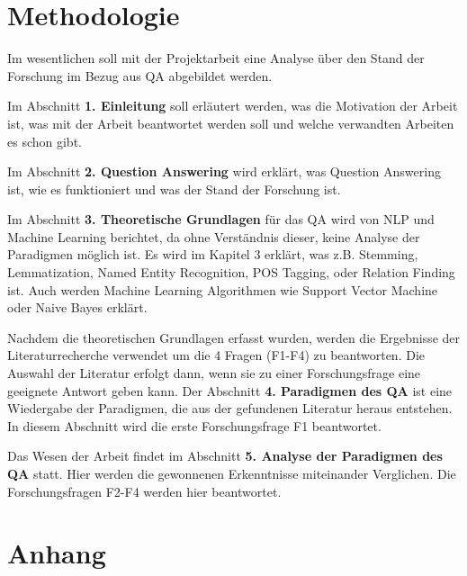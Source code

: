 \documentclass[
        ngerman,
        paper=a4,
        numbers=noendperiod,
]{scrreprt}
\begin{document}
\chapter{Methodologie}


Im wesentlichen soll mit der Projektarbeit eine Analyse über den Stand der Forschung im Bezug aus QA abgebildet werden.

Im Abschnitt \textbf{1. Einleitung} soll erläutert werden, was die Motivation der Arbeit ist, was mit der Arbeit beantwortet werden soll und welche verwandten Arbeiten es schon gibt.

Im Abschnitt \textbf{2. Question Answering} wird erklärt, was Question Answering ist, wie es funktioniert und was der Stand der Forschung ist.

Im Abschnitt \textbf{3. Theoretische Grundlagen} für das QA wird von NLP und Machine Learning berichtet, da ohne Verständnis dieser, keine Analyse der Paradigmen möglich ist. Es wird im Kapitel 3 erklärt, was z.B. Stemming, Lemmatization, Named Entity Recognition, POS Tagging, oder Relation Finding ist. Auch werden Machine Learning Algorithmen wie Support Vector Machine oder Naive Bayes erklärt. 

Nachdem die theoretischen Grundlagen erfasst wurden, werden die Ergebnisse der Literaturrecherche verwendet um die 4 Fragen (F1-F4) zu beantworten. Die Auswahl der Literatur erfolgt dann, wenn sie zu einer Forschungsfrage eine geeignete Antwort geben kann. Der Abschnitt \textbf{4. Paradigmen des QA} ist eine Wiedergabe der Paradigmen, die aus der gefundenen Literatur heraus entstehen. In diesem Abschnitt wird die erste Forschungsfrage F1 beantwortet.

Das Wesen der Arbeit findet im Abschnitt \textbf{5. Analyse der Paradigmen des QA} statt. Hier werden die gewonnenen Erkenntnisse miteinander Verglichen. Die Forschungsfragen F2-F4 werden hier beantwortet.














\appendix 
\chapter{Anhang}
\label{chapter:Anhang}%


\clearpage
        
\end{document}
